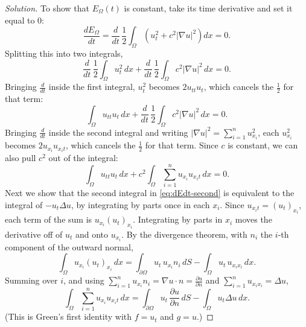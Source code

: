 \documentclass[11pt]{article}
\newcommand{\pd}[2]{\frac{\partial #1}{\partial #2}}
\newcommand{\lap}{\Delta}
\newcommand{\grad}{\nabla}
\theoremstyle{definition}
\begin{document}
\begin{proof}[Solution]
To show that $E_\Omega(t)$ is constant, take its time derivative and set it
equal to 0:
\begin{equation} \label{eq:dEdt}
\frac{dE_\Omega}{dt} = \frac{d}{dt} \, \frac{1}{2} \int_\Omega
  \left( u_t^2 + c^2 |\grad u|^2 \right) dx = 0.
\end{equation}
Splitting this into two integrals,
\begin{equation} \label{eq:dEdt-split}
\frac{d}{dt} \, \frac{1}{2} \int_\Omega u_t^2 \, dx
  + \frac{d}{dt} \, \frac{1}{2} \int_\Omega c^2 |\grad u|^2 \, dx = 0.
\end{equation}
Bringing $\frac{d}{dt}$ inside the first integral, $u_t^2$ becomes
$2 u_{tt} u_t$, which cancels the $\frac{1}{2}$ for that term:
\begin{equation} \label{eq:dEdt-first}
\int_\Omega u_{tt} u_t \, dx
  + \frac{d}{dt} \, \frac{1}{2} \int_\Omega c^2 |\grad u|^2 \, dx = 0.
\end{equation}
Bringing $\frac{d}{dt}$ inside the second integral and writing
$|\grad u|^2 = \sum_{i=1}^n u_{x_i}^2$, each $u_{x_i}^2$ becomes
$2 u_{x_i} u_{x_i t}$, which cancels the $\frac{1}{2}$ for that term. Since
$c$ is constant, we can also pull $c^2$ out of the integral:
\begin{equation} \label{eq:dEdt-second}
\int_\Omega u_{tt} u_t \, dx
  + c^2 \int_\Omega \sum_{i=1}^n u_{x_i} u_{x_i t} \, dx = 0.
\end{equation}
Next we show that the second integral in \eqref{eq:dEdt-second} is equivalent
to the integral of $-u_t \lap u$, by integrating by parts once in each $x_i$.
Since $u_{x_i t} = (u_t)_{x_i}$, each term of the sum is
$u_{x_i} (u_t)_{x_i}$. Integrating by parts in $x_i$ moves the derivative off
of $u_t$ and onto $u_{x_i}$. By the divergence theorem, with $n_i$ the $i$-th
component of the outward normal,
\begin{equation} \label{eq:ibp-component}
\int_\Omega u_{x_i} (u_t)_{x_i} \, dx
  = \int_{\partial\Omega} u_t \, u_{x_i} n_i \, dS
  - \int_\Omega u_t \, u_{x_i x_i} \, dx.
\end{equation}
Summing over $i$, and using $\sum_{i=1}^n u_{x_i} n_i = \grad u \cdot n
= \pd{u}{n}$ and $\sum_{i=1}^n u_{x_i x_i} = \lap u$,
\begin{equation} \label{eq:ibp-sum}
\int_\Omega \sum_{i=1}^n u_{x_i} u_{x_i t} \, dx
  = \int_{\partial\Omega} u_t \, \pd{u}{n} \, dS
  - \int_\Omega u_t \lap u \, dx.
\end{equation}
(This is Green's first identity with $f = u_t$ and $g = u$.)

\end{proof}
\end{document}
